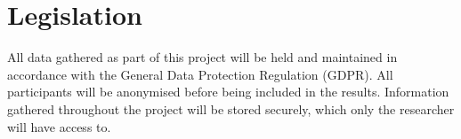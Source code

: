 \section*{Legislation}
All data gathered as part of this project will be held and maintained in accordance with the General Data Protection Regulation (GDPR). All participants will be anonymised before being included in the results. Information gathered throughout the project will be stored securely, which only the researcher will have access to.
